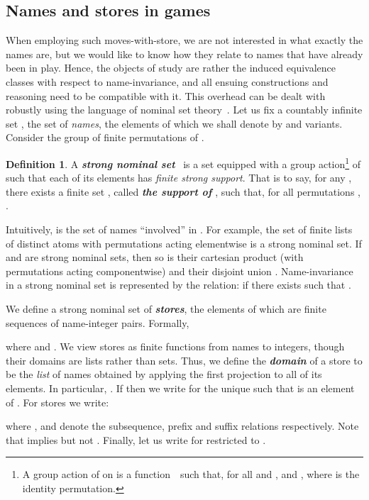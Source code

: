 \documentclass{CSML}
\theoremstyle{definition}\newtheorem{definition}[thm]{Definition}
\theoremstyle{definition}\newtheorem{example}[thm]{Example}
\theoremstyle{definition}\newtheorem{proposition}[thm]{Proposition}
\theoremstyle{definition}\newtheorem{lemma}[thm]{Lemma}
\theoremstyle{definition}\newtheorem{theorem}[thm]{Theorem}
\theoremstyle{definition}\newtheorem{corollary}[thm]{Corollary}
\theoremstyle{definition}\newtheorem{remark}[thm]{Remark}
\newcommand\boldemph[1]{\emph{\textbf{#1}}}
\begin{document}
\subsection{Names and stores in games}

When employing such moves-with-store, we are not interested in what exactly the names are,
but we would like to know how they relate to names that have already been in play. Hence,
the objects of study are rather the induced equivalence classes with respect to name-invariance, and all ensuing constructions and reasoning need to be compatible with it. This overhead can be dealt with robustly using the language of nominal set theory~\cite{GP02}.
Let us fix a countably infinite set , the set of \emph{names}, the elements of which we shall denote by  and variants. Consider the group  of finite permutations of . 

\begin{definition}
A \boldemph{strong nominal set}~\cite{GP02,Tze09}
is a set equipped with a group action\footnote{A group action of  on  is a function\, \, such that, for all  and ,   and , where  is the identity permutation.}
of 
such that each of its elements has \emph{finite strong support}. That is to say, for any ,
there exists a finite set , called \boldemph{the support of }, such that, for all permutations , .
\end{definition}

Intuitively,  is the set of names ``involved'' in .
For example, the set  of finite lists of distinct atoms with permutations acting elementwise is a strong nominal set.
If  and  are strong nominal sets, then so is their cartesian product  (with permutations acting componentwise) and their disjoint union .
Name-invariance in a strong nominal set  is represented by the relation:  if there exists  such that .




We define a strong nominal set of \boldemph{stores}, the elements of which are finite sequences of
name-integer pairs. Formally,

where  and . 
We view stores as finite functions from names to
integers, though their domains are lists rather than sets. Thus, we
define the \boldemph{domain} of a store to be the \emph{list} of
names obtained by applying the first projection to all of its elements. In particular, . If  then we write  for the unique  such that  is an element of . 
For stores  we write:

where , and  denote the subsequence, prefix and suffix relations
respectively.
Note that  implies  but not .
Finally, let us write  for  restricted to .
\end{document}
